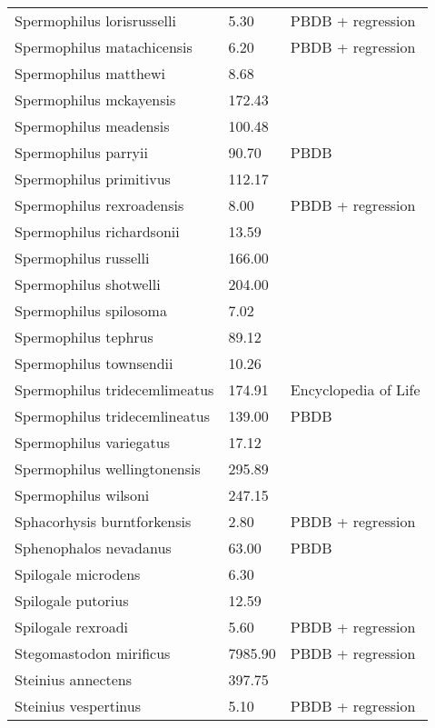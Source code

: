\begin{longtable}{p{} p{} p{}}
    Spermophilus lorisrusselli & 5.30 & PBDB + regression \\ 
    Spermophilus matachicensis & 6.20 & PBDB + regression \\ 
    Spermophilus matthewi & 8.68 & \cite{Beatty2009} \\ 
    Spermophilus mckayensis & 172.43 & \cite{Tomiya2013} \\ 
    Spermophilus meadensis & 100.48 & \cite{Tomiya2013} \\ 
    Spermophilus parryii & 90.70 & PBDB \\ 
    Spermophilus primitivus & 112.17 & \cite{Tomiya2013} \\ 
    Spermophilus rexroadensis & 8.00 & PBDB + regression \\ 
    Spermophilus richardsonii & 13.59 & \cite{Smith2004} \\ 
    Spermophilus russelli & 166.00 & \cite{McKenna2011} \\ 
    Spermophilus shotwelli & 204.00 & \cite{McKenna2011} \\ 
    Spermophilus spilosoma & 7.02 & \cite{Smith2004} \\ 
    Spermophilus tephrus & 89.12 & \cite{Tomiya2013} \\ 
    Spermophilus townsendii & 10.26 & \cite{Smith2004} \\ 
    Spermophilus tridecemlimeatus & 174.91 & Encyclopedia of Life \\ 
    Spermophilus tridecemlineatus & 139.00 & PBDB \\ 
    Spermophilus variegatus & 17.12 & \cite{Smith2004} \\ 
    Spermophilus wellingtonensis & 295.89 & \cite{Tomiya2013} \\ 
    Spermophilus wilsoni & 247.15 & \cite{Tomiya2013} \\ 
    Sphacorhysis burntforkensis & 2.80 & PBDB + regression \\ 
    Sphenophalos nevadanus & 63.00 & PBDB \\ 
    Spilogale microdens & 6.30 & \cite{Chester2012} \\ 
    Spilogale putorius & 12.59 & \cite{Smith2004} \\ 
    Spilogale rexroadi & 5.60 & PBDB + regression \\ 
    Stegomastodon mirificus & 7985.90 & PBDB + regression \\ 
    Steinius annectens & 397.75 & \cite{Strait2001} \\ 
    Steinius vespertinus & 5.10 & PBDB + regression \\ 

\end{longtable}
